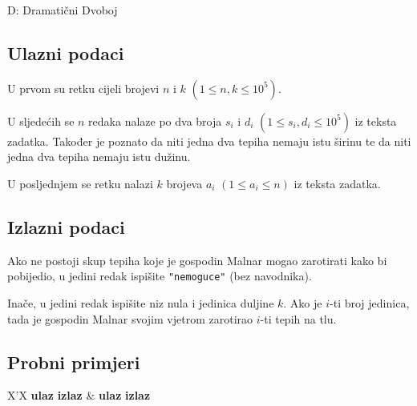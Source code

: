 \begin{statement}[
  timelimit=1 s,
  memorylimit=512 MiB,
]{D: Dramatični Dvoboj}
\subsection*{Ulazni podaci}
U prvom su retku cijeli brojevi $n$ i $k$ $(1 \le n, k \le 10^5)$.

U sljedećih se $n$ redaka nalaze po dva broja $s_i$ i $d_i$
$(1 \le s_i, d_i \le 10^5)$ iz teksta zadatka. Također je poznato
da niti jedna dva tepiha nemaju istu širinu te da niti jedna dva tepiha
nemaju istu dužinu.

U posljednjem se retku nalazi $k$ brojeva $a_i$ $(1 \le a_i \le n)$ iz
teksta zadatka.

\subsection*{Izlazni podaci}
Ako ne postoji skup tepiha koje je gospodin Malnar mogao zarotirati kako bi
pobijedio, u jedini redak ispišite \texttt{"nemoguce"} (bez navodnika).

Inače, u jedini redak ispišite niz nula i jedinica duljine $k$. Ako je $i$-ti broj
jedinica, tada je gospodin Malnar svojim vjetrom zarotirao $i$-ti tepih na
tlu.

\subsection*{Probni primjeri}
\begin{tabularx}{\textwidth}{X'X}
  \textbf{ulaz}
  \linespread{1}{}
  \textbf{izlaz}
  \linespread{1}{} &
  \textbf{ulaz}
  \linespread{1}{}
  \textbf{izlaz}
  \linespread{1}{}
\end{tabularx}

\end{statement}

